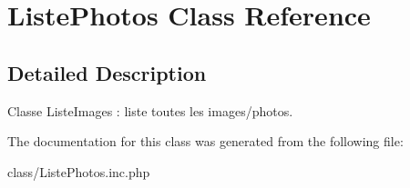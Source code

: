 \hypertarget{class_liste_photos}{
\section{ListePhotos Class Reference}
\label{class_liste_photos}
}


\subsection{Detailed Description}
Classe ListeImages : liste toutes les images/photos. 

The documentation for this class was generated from the following file:\begin{DoxyCompactItemize}
\item 
class/ListePhotos.inc.php\end{DoxyCompactItemize}
